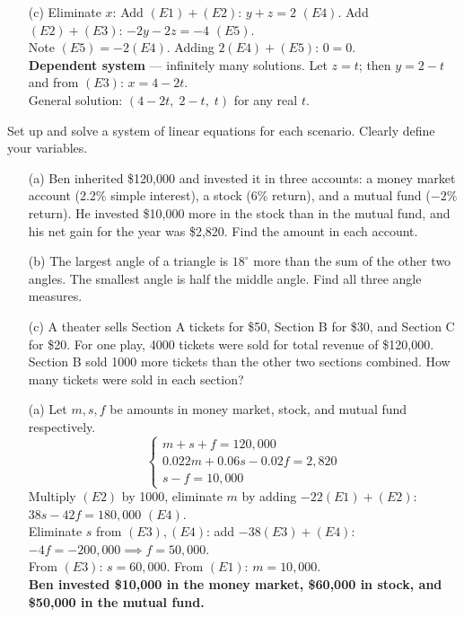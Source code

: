 \documentclass{ximera}
\begin{document}
\begin{problem}
\begin{solution}
\begin{enumerate}
  \item[(c)] Eliminate $x$: Add $(E1)+(E2)$: $y+z=2$ $(E4)$. Add $(E2)+(E3)$: $-2y-2z=-4$ $(E5)$.\\
  Note $(E5)=-2(E4)$. Adding $2(E4)+(E5)$: $0=0$.\\
  \textbf{Dependent system} — infinitely many solutions. Let $z=t$; then $y=2-t$ and from $(E3)$: $x=4-2t$.\\
  General solution: $(4-2t,\;2-t,\;t)$ for any real $t$.
\end{enumerate}
\end{solution}
\end{problem}


\begin{problem}
Set up and solve a system of linear equations for each scenario. Clearly define your variables.
\begin{enumerate}
  \item[(a)] Ben inherited \$120,000 and invested it in three accounts: a money market account (2.2\% simple interest), a stock (6\% return), and a mutual fund ($-2\%$ return). He invested \$10,000 more in the stock than in the mutual fund, and his net gain for the year was \$2,820. Find the amount in each account.
  \medskip
  \item[(b)] The largest angle of a triangle is $18^\circ$ more than the sum of the other two angles. The smallest angle is half the middle angle. Find all three angle measures.
  \medskip
  \item[(c)] A theater sells Section A tickets for \$50, Section B for \$30, and Section C for \$20. For one play, 4000 tickets were sold for total revenue of \$120,000. Section B sold 1000 more tickets than the other two sections combined. How many tickets were sold in each section?
\end{enumerate}

\begin{solution}
\begin{enumerate}
  \item[(a)] Let $m, s, f$ be amounts in money market, stock, and mutual fund respectively.
  $$\begin{cases} m+s+f=120{,}000 \\ 0.022m+0.06s-0.02f=2{,}820 \\ s-f=10{,}000 \end{cases}$$
  Multiply $(E2)$ by 1000, eliminate $m$ by adding $-22(E1)+(E2)$: $38s-42f=180{,}000$ $(E4)$.\\
  Eliminate $s$ from $(E3),(E4)$: add $-38(E3)+(E4)$: $-4f=-200{,}000 \implies f=50{,}000$.\\
  From $(E3)$: $s=60{,}000$. From $(E1)$: $m=10{,}000$.\\
  \textbf{Ben invested \$10,000 in the money market, \$60,000 in stock, and \$50,000 in the mutual fund.}


\end{enumerate}
\end{solution}
\end{problem}
\end{document}
